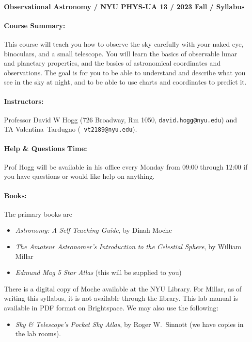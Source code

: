 \paragraph{Observational Astronomy / NYU PHYS-UA 13 / 2023 Fall / Syllabus}

\paragraph{Course Summary:} This course will teach you how to
observe the sky carefully with your naked eye, binoculars, and a small
telescope. You will learn the basics of observable lunar and planetary
properties, and the basics of astronomical coordinates and
observations. The goal is for you to be able to understand and
describe what you see in the sky at night, and to be able to use
charts and coordinates to predict it.

\paragraph{Instructors:} Professor David W Hogg (726 Broadway,
Rm 1050, {\tt david.hogg@nyu.edu}) and TA Valentina~Tardugno ({\tt
  vt2189@nyu.edu}).

\paragraph{Help \& Questions Time:} Prof Hogg will be available in
  his office every Monday from 09:00 through 12:00 if you
  have questions or would like help on anything.

\paragraph{Books:} The primary books are
\begin{itemize}
\item {\it Astronomy: A Self-Teaching Guide}, by Dinah Moche
\item {\it The Amateur Astronomer's Introduction to the Celestial
  Sphere}, by William Millar
\item {\it Edmund Mag 5 Star Atlas} (this will be supplied to you)
\end{itemize}
There is a digital copy of Moche available at the NYU
Library. For Millar, as of writing this syllabus, it is not
available through the library. This lab manual is available in PDF
format on Brightspace. We may also use the following:
\begin{itemize}
\item {\it Sky \& Telescope's Pocket Sky Atlas}, by Roger W.~Sinnott
(we have copies in the lab rooms).
\end{itemize}


